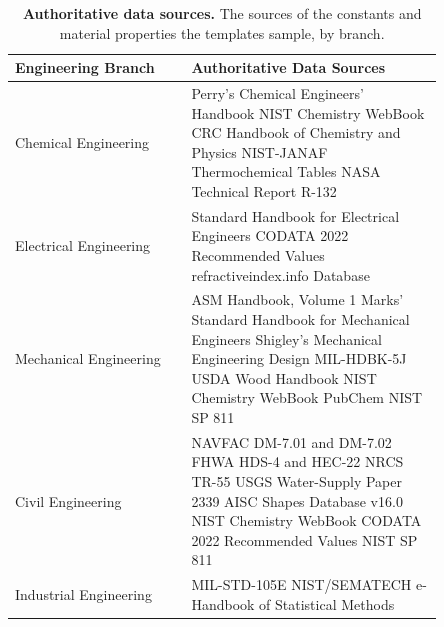 \begin{table}[t]
\small
\centering
\renewcommand{\arraystretch}{1.1}
\setlength{\tabcolsep}{6pt}
\begin{tabular}{p{0.35\linewidth} p{0.50\linewidth}}
\toprule
\rowcolor{gray!10}\textbf{Engineering Branch} & \textbf{Authoritative Data Sources} \\
\midrule
Chemical Engineering &
Perry's Chemical Engineers' Handbook \newline
NIST Chemistry WebBook \newline
CRC Handbook of Chemistry and Physics \newline
NIST-JANAF Thermochemical Tables \newline
NASA Technical Report R-132 \\
\addlinespace[2pt]
Electrical Engineering &
Standard Handbook for Electrical Engineers \newline
CODATA 2022 Recommended Values \newline
refractiveindex.info Database \\
\addlinespace[2pt]
Mechanical Engineering &
ASM Handbook, Volume 1 \newline
Marks' Standard Handbook for Mechanical Engineers \newline
Shigley's Mechanical Engineering Design \newline
MIL-HDBK-5J \newline
USDA Wood Handbook \newline
NIST Chemistry WebBook \newline
PubChem \newline
NIST SP 811 \\
\addlinespace[2pt]
Civil Engineering &
NAVFAC DM-7.01 and DM-7.02 \newline
FHWA HDS-4 and HEC-22 \newline
NRCS TR-55 \newline
USGS Water-Supply Paper 2339 \newline
AISC Shapes Database v16.0 \newline
NIST Chemistry WebBook \newline
CODATA 2022 Recommended Values \newline
NIST SP 811 \\
\addlinespace[2pt]
Industrial Engineering &
MIL-STD-105E \newline
NIST/SEMATECH e-Handbook of Statistical Methods \\
\bottomrule
\end{tabular}
\caption{\textbf{Authoritative data sources.} The sources of the constants and material properties
the templates sample, by branch.}
\label{tab:authoritative_sources}
\end{table}

